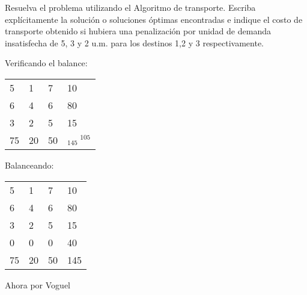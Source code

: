 
















\item  Resuelva el problema utilizando el Algoritmo de transporte.
Escriba explícitamente la solución o soluciones óptimas encontradas e indique el
costo de transporte obtenido si hubiera una penalización por unidad de demanda
insatisfecha de 5, 3 y 2 u.m. para los destinos 1,2 y 3 respectivamente.


Verificando el balance:
\begin{center}
\begin{tabular}{llll}
\cline{1-3}
\multicolumn{1}{|l|}{5} & \multicolumn{1}{l|}{1} & \multicolumn{1}{l|}{7} & 10 \\ \cline{1-3}
\multicolumn{1}{|l|}{6} & \multicolumn{1}{l|}{4} & \multicolumn{1}{l|}{6} & 80 \\ \cline{1-3}
\multicolumn{1}{|l|}{3} & \multicolumn{1}{l|}{2} & \multicolumn{1}{l|}{5} & 15 \\ \cline{1-3}
75 & 20 & 50 & $_{145}\: ^{105}$
\end{tabular}    
\end{center}

    

Balanceando:\\

\begin{center}
\begin{tabular}{llll}
\cline{1-3}
\multicolumn{1}{|l|}{5} & \multicolumn{1}{l|}{1} & \multicolumn{1}{l|}{7} & 10 \\ \cline{1-3}
\multicolumn{1}{|l|}{6} & \multicolumn{1}{l|}{4} & \multicolumn{1}{l|}{6} & 80 \\ \cline{1-3}
\multicolumn{1}{|l|}{3} & \multicolumn{1}{l|}{2} & \multicolumn{1}{l|}{5} & 15 \\ \cline{1-3}
\multicolumn{1}{|l|}{0} & \multicolumn{1}{l|}{0} & \multicolumn{1}{l|}{0} & 40 \\ \cline{1-3}
75 & 20 & 50 & 145
\end{tabular}   
\end{center}        


Ahora por Voguel

